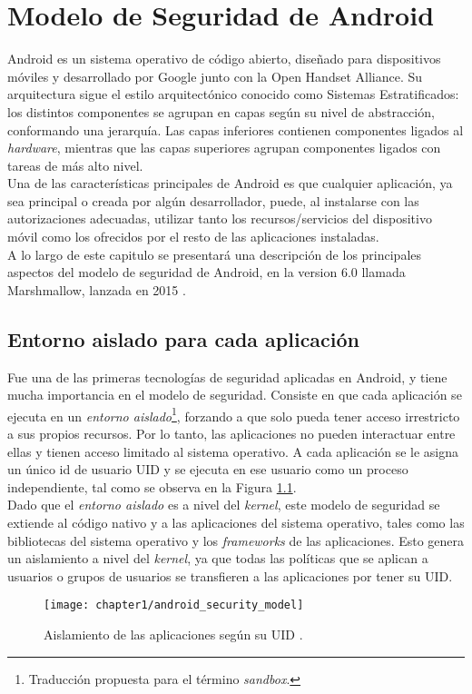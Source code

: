 \chapter{Modelo de Seguridad de Android}
Android \cite{aos} es un sistema operativo de código abierto, diseñado para dispositivos móviles y desarrollado por Google junto con la Open Handset Alliance. Su arquitectura sigue el estilo arquitectónico conocido como Sistemas Estratificados: los distintos componentes se agrupan en capas según su nivel de abstracción, conformando una jerarquía. Las capas inferiores contienen componentes ligados al \textit{hardware}, mientras que las capas superiores agrupan componentes ligados con tareas de más alto nivel.\\

Una de las características principales de Android es que cualquier aplicación, ya sea principal o
creada por algún desarrollador, puede, al instalarse con las autorizaciones adecuadas, utilizar tanto
los recursos/servicios del dispositivo móvil como los ofrecidos por el resto de las aplicaciones
instaladas.\\

A lo largo de este capitulo se presentará una descripción de los principales aspectos del modelo de seguridad de Android,  en la version 6.0 llamada Marshmallow, lanzada en 2015 \cite{aosm}.
\section{Entorno aislado para cada aplicación}\label{ch01-sandbox}
Fue una de las primeras tecnologías de seguridad aplicadas en Android, y tiene mucha importancia en el modelo de seguridad. Consiste en que cada aplicación se ejecuta en un \emph{entorno aislado}\footnote{Traducción propuesta para el término \textit{sandbox}.}, forzando a que solo pueda tener acceso irrestricto a sus propios recursos. Por lo tanto, las aplicaciones no pueden interactuar entre ellas y tienen acceso limitado al sistema operativo. A cada aplicación se le asigna un único id de usuario UID y se ejecuta en ese usuario como un proceso independiente, tal como se observa en la Figura \ref{fig:ch01:sandbox}.\\

Dado que el \emph{entorno aislado} es a nivel del \textit{kernel}, este modelo de seguridad se extiende al código nativo y a las aplicaciones del sistema operativo, tales como las bibliotecas del sistema operativo y los \textit{frameworks} de las aplicaciones. Esto genera un aislamiento a nivel del \textit{kernel}, ya que todas las políticas que se aplican a usuarios o grupos de usuarios se transfieren a las aplicaciones por tener su UID.
\begin{figure}[hbtp]
	\begin{center}
		\texttt{[image: chapter1/android\_security\_model]}
	    \caption{Aislamiento de las aplicaciones según su UID \cite{asreview2015}.}
	    \label{fig:ch01:sandbox}
    \end{center}
\end{figure}
